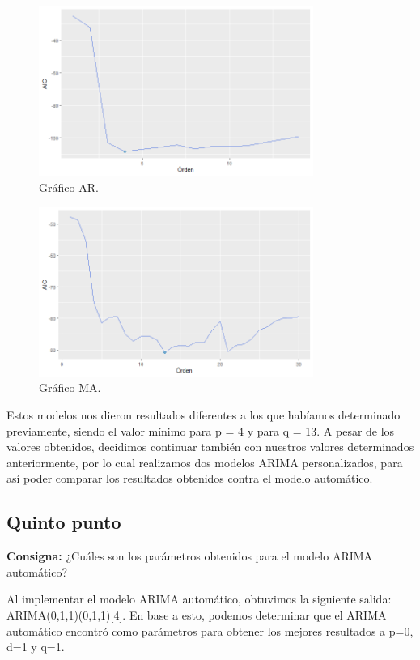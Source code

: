\documentclass{article} %
\begin{document}
\begin{figure}[H]
	\centering
	\includegraphics[width=0.8\textwidth]{images/4-10 AR}
	\caption{Gráfico AR.}
	\label{fig:AR}
\end{figure} 
\begin{figure}[H]
	\centering
	\includegraphics[width=0.8\textwidth]{images/4-11 MA}
	\caption{Gráfico MA.}
	\label{fig:MA}
\end{figure} 

Estos modelos nos dieron resultados diferentes a los que habíamos determinado previamente, siendo el valor mínimo para p = 4 y para q = 13. A pesar de los valores obtenidos, decidimos continuar también con nuestros valores determinados anteriormente, por lo cual realizamos dos modelos ARIMA personalizados, para así poder comparar los resultados obtenidos contra el modelo automático. 


\subsection{Quinto punto}

\textbf{Consigna:} ¿Cuáles son los parámetros obtenidos para el modelo ARIMA automático?

Al implementar el modelo ARIMA automático, obtuvimos la siguiente salida: ARIMA(0,1,1)(0,1,1)[4]. En base a esto, podemos determinar que el ARIMA automático encontró como parámetros para obtener los mejores resultados a p=0, d=1 y q=1.
\end{document}
